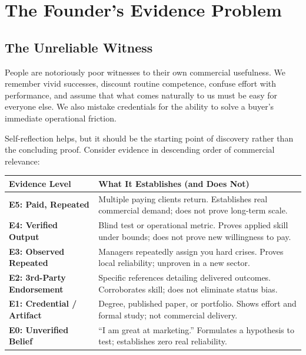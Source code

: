 \section{The Founder's Evidence Problem}

\subsection{The Unreliable Witness}

People are notoriously poor witnesses to their own commercial usefulness. We remember vivid successes, discount routine competence, confuse effort with performance, and assume that what comes naturally to us must be easy for everyone else. We also mistake credentials for the ability to solve a buyer's immediate operational friction.

Self-reflection helps, but it should be the starting point of discovery rather than the concluding proof. Consider evidence in descending order of commercial relevance:

\begin{tcolorbox}[
  enhanced,
  colback=white,
  colframe=BayesBorder!80!white,
  boxrule=0.4pt,
  arc=2pt,
  left=4pt,right=4pt,top=4pt,bottom=4pt,
  before skip=3pt,after skip=5pt
]
\scriptsize
\setlength{\tabcolsep}{3pt}
\renewcommand{\arraystretch}{1.2}
\begin{tabularx}{\linewidth}{@{} >{\bfseries\color{BayesInk}}p{2.2cm} >{\color{BayesInk}}X @{}}
\toprule
\textbf{Evidence Level} & \textbf{What It Establishes (and Does Not)} \\
\midrule
E5: Paid, Repeated & Multiple paying clients return. Establishes real commercial demand; does not prove long-term scale. \\
\midrule
E4: Verified Output & Blind test or operational metric. Proves applied skill under bounds; does not prove new willingness to pay. \\
\midrule
E3: Observed Repeated & Managers repeatedly assign you hard crises. Proves local reliability; unproven in a new sector. \\
\midrule
E2: 3rd-Party Endorsement & Specific references detailing delivered outcomes. Corroborates skill; does not eliminate status bias. \\
\midrule
E1: Credential / Artifact & Degree, published paper, or portfolio. Shows effort and formal study; not commercial delivery. \\
\midrule
E0: Unverified Belief & ``I am great at marketing.'' Formulates a hypothesis to test; establishes zero real reliability. \\
\bottomrule
\end{tabularx}
\end{tcolorbox}

